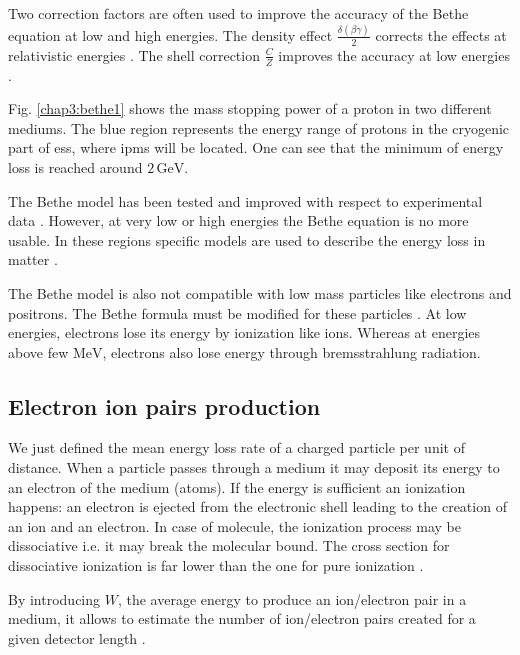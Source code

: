 \begin{refsection}
  Two correction factors are often used to improve the accuracy of the Bethe equation at low and high energies. The density effect \(\frac{\delta(\beta \gamma)}{2}\) corrects the effects at relativistic energies \cite{Sternheimer1984}. The shell correction \(\frac{C}{Z}\) improves the accuracy at low energies \cite{Bichsel2002}.

  

  Fig. \ref{chap3:bethe1} shows the mass stopping power of a proton in two different mediums. The blue region represents the energy range of protons in the cryogenic part of \acrshort{ess}, where \acrshort{ipm}s will be located. One can see that the minimum of energy loss is reached around \(2\,\mathrm{GeV}\).

  The Bethe model has been tested and improved with respect to experimental data \cite{Porter1990}. However, at very low or high energies the Bethe equation is no more usable. In these regions specific models are used to describe the energy loss in matter \cite{Ziegler1985, Allison1980}.

  The Bethe model is also not compatible with low mass particles like electrons and positrons. The Bethe formula must be modified for these particles \cite{Rieke1972}\cite[p. 452]{Tanabashi2018}. At low energies, electrons lose its energy by ionization like ions. Whereas at energies above few \(\mathrm{MeV}\), electrons also lose energy through bremsstrahlung radiation.

  \subsection{Electron ion pairs production}
  We just defined the mean energy loss rate of a charged particle per unit of distance. When a particle passes through a medium it may deposit its energy to an electron of the medium (atoms).
  If the energy is sufficient an ionization happens: an electron is ejected from the electronic shell leading to the creation of an ion and an electron. In case of molecule, the ionization process may be dissociative i.e. it may break the molecular bound. The cross section for dissociative ionization is far lower than the one for pure ionization \cite{Dimopoulou2004}.

  By introducing \(W\), the average energy to produce an ion/electron pair in a medium, it allows to estimate the number of ion/electron pairs created for a given detector length \cite[]{Weiss1955,Bichsel1979}.


\end{refsection}

